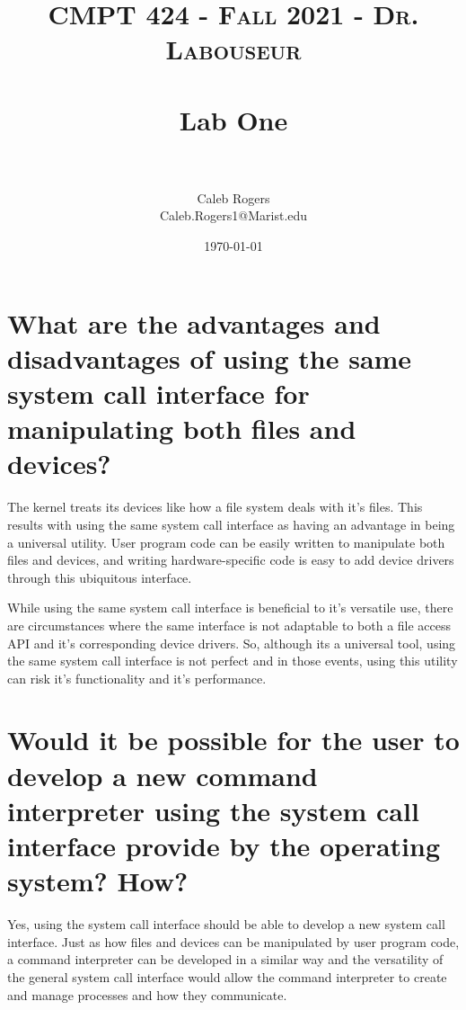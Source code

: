 \documentclass[letterpaper, 10pt,DIV=13]{scrartcl}
\title{	
   \normalfont \normalsize 
   \textsc{CMPT 424 - Fall 2021 - Dr. Labouseur} \\[10pt] %
   \horrule{0.5pt} \\[0.25cm] 	%
   \huge Lab One  \\     	    %
   \horrule{0.5pt} \\[0.25cm] 	%
}
\author{Caleb Rogers \\ \normalsize Caleb.Rogers1@Marist.edu}
\date{\normalsize\today} 	%
\numberwithin{equation}{section} %
\numberwithin{figure}{section} %
\numberwithin{table}{section} %
\begin{document}
\maketitle %

\section{What are the advantages and disadvantages of using the same system call interface for manipulating both files and devices?}

The kernel treats its devices like how a file system deals with it's files. This results with using the same system call interface as having an advantage in being a universal utility. User program code can be easily written to manipulate both files and devices, and writing hardware-specific code is easy to add device drivers through this ubiquitous interface.

While using the same system call interface is beneficial to it's versatile use, there are circumstances where the same interface is not adaptable to both a file access API and it's corresponding device drivers. So, although its a universal tool, using the same system call interface is not perfect and in those events, using this utility can risk it's functionality and it's performance.

\section{Would it be possible for the user to develop a new command interpreter using the system call interface provide by the operating system? How?}

Yes, using the system call interface should be able to develop a new system call interface. Just as how files and devices can be manipulated by user program code, a command interpreter can be developed in a similar way and the versatility of the general system call interface would allow the command interpreter to create and manage processes and how they communicate.

\end{document}
